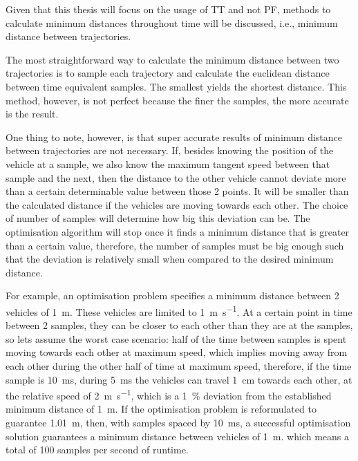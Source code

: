 \par Given that this thesis will focus on the usage of \ac{TT} and not \ac{PF}, methods to calculate minimum distances throughout time will be discussed, i.e., minimum distance between trajectories.
\par The most straightforward way to calculate the minimum distance between two trajectories is to sample each trajectory and calculate the euclidean distance between time equivalent samples. The smallest yields the shortest distance. This method, however, is not perfect because the finer the samples, the more accurate is the result. 
\par One thing to note, however, is that super accurate results of minimum distance between trajectories are not necessary. If, besides knowing the position of the vehicle at a sample, we also know the maximum tangent speed between that sample and the next, then the distance to the other vehicle cannot deviate more than a certain determinable value between those 2 points. It will be smaller than the calculated distance if the vehicles are moving towards each other. The choice of number of samples will determine how big this deviation can be. The optimisation algorithm will stop once it finds a minimum distance that is greater than a certain value, therefore, the number of samples must be big enough such that the deviation is relatively small when compared to the desired minimum distance. 
\par For example, an optimisation problem specifies a minimum distance between 2 vehicles of \SI{1}{\meter}. These vehicles are limited to \SI{1}{\meter\per\second}. At a certain point in time between 2 samples, they can be closer to each other than they are at the samples, so lets assume the worst case scenario: half of the time between samples is spent moving towards each other at maximum speed, which implies moving away from each other during the other half of time at maximum speed, therefore, if the time sample is \SI{10}{\milli\second}, during \SI{5}{\milli\second} the vehicles can travel \SI{1}{\centi\meter} towards each other, at the relative speed of \SI{2}{\meter\per\second}, which is a \SI{1}{\percent} deviation from the established minimum distance of \SI{1}{\meter}. If the optimisation problem is reformulated to guarantee \SI{1.01}{\meter}, then, with samples spaced by \SI{10}{\milli\second}, a successful optimisation solution guarantees a minimum distance between vehicles of \SI{1}{\meter}. which means a total of 100 samples per second of runtime.


